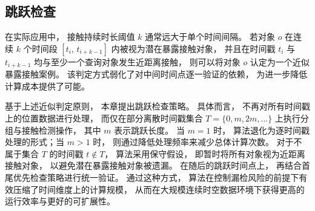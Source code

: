 \subsection{跳跃检查}

在实际应用中， 接触持续时长阈值 $k$ 通常远大于单个时间间隔。 若对象 $o$ 在连续 $k$ 个时间段 $[t_i,\,t_{i+k-1}]$ 内被视为潜在暴露接触对象， 并且在时间戳 $t_i$ 与 $t_{i+k-1}$ 均与至少一个查询对象发生近距离接触， 则可以将对象 $o$ 认定为一个近似暴露接触案例。 该判定方式弱化了对中间时间点逐一验证的依赖， 为进一步降低计算成本提供了可能。

基于上述近似判定原则， 本章提出跳跃检查策略。 具体而言， 不再对所有时间戳上的位置数据进行处理， 而仅在部分离散时间戳集合 $T=\{0,m,2m,\ldots\}$ 上执行分组与接触检测操作， 其中 $m$ 表示跳跃长度。 当 $m=1$ 时， 算法退化为逐时间戳处理的形式；当 $m>1$ 时， 则通过降低处理频率来减少总体计算次数。 对于不属于集合 $T$ 的时间戳 $t \notin T$， 算法采用保守假设， 即暂时将所有对象视为近距离接触对象， 以避免潜在暴露接触对象被遗漏。 在随后的跳跃时间点上， 再结合首尾优先检查策略进行统一验证。 通过这种方式， 算法在控制漏检风险的前提下有效压缩了时间维度上的计算规模， 从而在大规模连续时空数据环境下获得更高的运行效率与更好的可扩展性。



